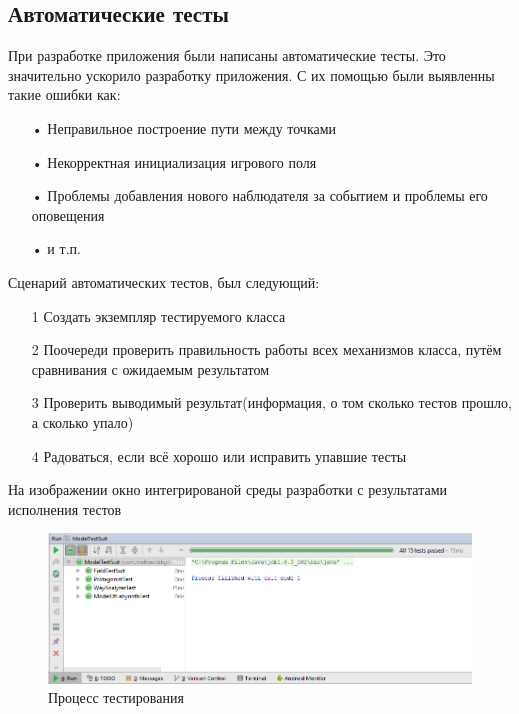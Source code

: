 \subsection{Автоматические тесты}

При разработке приложения были написаны автоматические тесты. Это значительно ускорило разработку приложения. С их помощью были выявленны такие ошибки как:

\begin{enumerate}
\item[•]  Неправильное построение пути между точками
\item[•]  Некорректная инициализация игрового поля
\item[•]  Проблемы добавления нового наблюдателя за событием и проблемы его оповещения
\item[•]  и т.п.\\
\end{enumerate}

Сценарий автоматических тестов, был следующий:
\begin{enumerate}
\item[1]  Создать экземпляр тестируемого класса
\item[2]  Поочереди проверить правильность работы всех механизмов класса, путём сравнивания с ожидаемым результатом
\item[3]  Проверить выводимый результат(информация, о том сколько тестов прошло, а сколько упало)
\item[4]  Радоваться, если всё хорошо или исправить упавшие тесты
\end{enumerate}

На изображении окно интегрированой среды разработки с результатами исполнения тестов

\begin{figure}[H]
	\begin{center}
		\includegraphics[scale=0.7]{pics/07.png}
		\caption{Процесс тестирования} 
		\label{pic:pic_name} %
	\end{center}
\end{figure}

